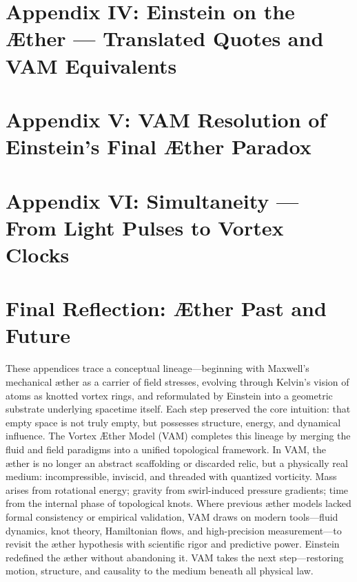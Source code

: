 \documentclass[preprint,notitlepage]{revtex4-2}
\begin{document}
        \section*{Appendix IV: Einstein on the Æther — Translated Quotes and VAM Equivalents}
            \label{appendix:einstein}
            

        \section*{Appendix V: VAM Resolution of Einstein’s Final Æther Paradox}
            \label{appendix:final-aether}
            

        \section{Appendix VI: Simultaneity — From Light Pulses to Vortex Clocks}
            \label{appendix:Simultaneity}
            

        \section*{Final Reflection: Æther Past and Future}
            These appendices trace a conceptual lineage—beginning with Maxwell's mechanical æther as a carrier of field stresses, evolving through Kelvin's vision of atoms as knotted vortex rings, and reformulated by Einstein into a geometric substrate underlying spacetime itself. Each step preserved the core intuition: that empty space is not truly empty, but possesses structure, energy, and dynamical influence.
            The Vortex Æther Model (VAM) completes this lineage by merging the fluid and field paradigms into a unified topological framework. In VAM, the æther is no longer an abstract scaffolding or discarded relic, but a physically real medium: incompressible, inviscid, and threaded with quantized vorticity. Mass arises from rotational energy; gravity from swirl-induced pressure gradients; time from the internal phase of topological knots.
            Where previous æther models lacked formal consistency or empirical validation, VAM draws on modern tools—fluid dynamics, knot theory, Hamiltonian flows, and high-precision measurement—to revisit the æther hypothesis with scientific rigor and predictive power.
            Einstein redefined the æther without abandoning it. VAM takes the next step—restoring motion, structure, and causality to the medium beneath all physical law.



    
    
\end{document}
